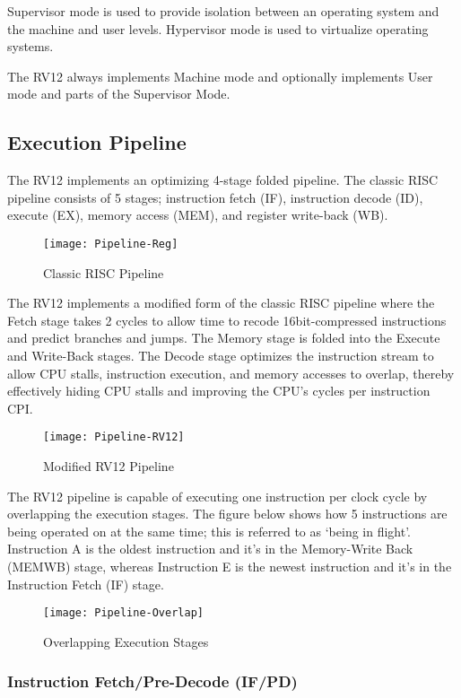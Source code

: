 Supervisor mode is used to provide isolation between an operating system
and the machine and user levels. Hypervisor mode is used to virtualize
operating systems.

The RV12 always implements Machine mode and optionally implements User mode and parts of the Supervisor Mode.

\subsection{Execution Pipeline}\label{execution-pipeline}

The RV12 implements an optimizing 4-stage folded pipeline. The classic RISC pipeline consists of 5 stages; instruction fetch (IF), instruction decode (ID), execute (EX), memory access (MEM), and register write-back (WB).

\begin{figure}[hbt]
  \texttt{[image: Pipeline-Reg]}
  \caption{Classic RISC Pipeline}
\end{figure}

The RV12 implements a modified form of the classic RISC pipeline where the
Fetch stage takes 2 cycles to allow time to recode 16bit-compressed
instructions and predict branches and jumps. The Memory stage is folded
into the Execute and Write-Back stages. The Decode stage optimizes the
instruction stream to allow CPU stalls, instruction execution, and
memory accesses to overlap, thereby effectively hiding CPU stalls and
improving the CPU's cycles per instruction CPI.

\begin{figure}[hbt]
  \texttt{[image: Pipeline-RV12]}
  \caption{Modified RV12 Pipeline}
\end{figure}

The RV12 pipeline is capable of executing one instruction per clock
cycle by overlapping the execution stages. The figure below shows how 5
instructions are being operated on at the same time; this is referred to
as `being in flight'. Instruction A is the oldest instruction and it's
in the Memory-Write Back (MEMWB) stage, whereas Instruction E is the
newest instruction and it's in the Instruction Fetch (IF) stage.

\begin{figure}[hbt]
  \texttt{[image: Pipeline-Overlap]}
  \caption{Overlapping Execution Stages}
\end{figure}

\subsubsection{Instruction Fetch/Pre-Decode
(IF/PD)}\label{instruction-fetchpre-decode-ifpd}

